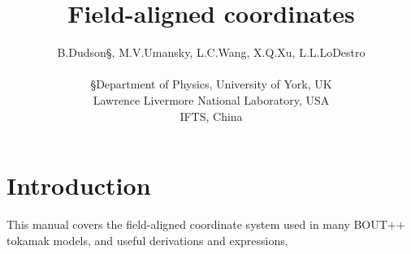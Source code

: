 \documentclass[12pt]{article}
\begin{document}
\title{Field-aligned coordinates}
\author{B.Dudson\S, M.V.Umansky\dag, L.C.Wang\ddag, X.Q.Xu\dag,
L.L.LoDestro\dag \\
\\
  \S Department of Physics, University of York, UK \\
  \dag Lawrence Livermore National Laboratory, USA \\
  \ddag IFTS, China}
  \date{}
\maketitle

\tableofcontents



\section{Introduction}
This manual covers the field-aligned coordinate system used in many BOUT++
tokamak models, and useful derivations and expressions.
\end{document}
